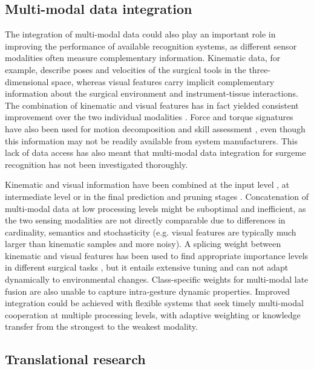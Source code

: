 \documentclass[journal]{IEEEtran}
\begin{document}
\subsection{Multi-modal data integration}

The integration of multi-modal data could also play an important role in improving the performance of available recognition systems, as different sensor modalities often measure complementary information. Kinematic data, for example, describe poses and velocities of the surgical tools in the three-dimensional space, whereas visual features carry implicit complementary information about the surgical environment and instrument-tissue interactions. The combination of kinematic and visual features has in fact yielded consistent improvement over the two individual modalities \cite{Tao2013, Lea2015semantic, Murali2016, Qin2020}. Force and torque signatures have also been used for motion decomposition and skill assessment \cite{Selvaggio2018, Rosen2001, Rosen2002}, even though this information may not be readily available from system manufacturers. This lack of data access has also meant that multi-modal data integration for surgeme recognition has not been investigated thoroughly. 

Kinematic and visual information have been combined at the input level \cite{Murali2016, Zhao2018, Lea2015semantic}, at intermediate level \cite{Qin2020b} or in the final prediction \cite{Qin2020} and pruning stages \cite{Murali2016, Zhao2018}. Concatenation of multi-modal data at low processing levels might be suboptimal and inefficient, as the two sensing modalities are not directly comparable due to differences in cardinality, semantics and stochasticity \cite{Murali2016} (e.g. visual features are typically much larger than kinematic samples and more noisy). 
A splicing weight between kinematic and visual features has been used to find appropriate importance levels in different surgical tasks \cite{Zhao2018}, but it entails extensive tuning and can not adapt dynamically to environmental changes.
Class-specific weights for multi-modal late fusion \cite{Qin2020} are also unable to capture intra-gesture dynamic properties.
Improved integration could be achieved with flexible systems that seek timely multi-modal cooperation at multiple processing levels, with adaptive weighting or knowledge transfer from the strongest to the weakest modality.


\subsection{Translational research}
\end{document}
